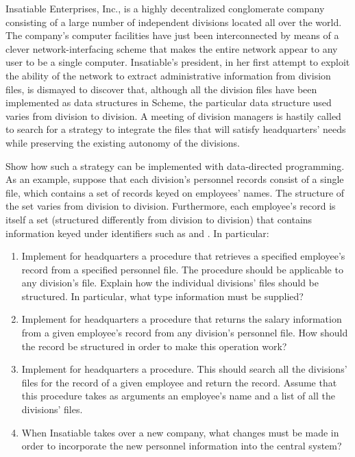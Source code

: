 


\begin{exercise}
	\label{Exercise 2.74}
	Insatiable Enterprises, Inc., is a highly decentralized conglomerate company consisting of a large number of independent divisions located all over the world.
	The company’s computer facilities have just been interconnected by means of a clever network-interfacing scheme that makes the entire network appear to any user to be a single computer.
	Insatiable’s president, in her first attempt to exploit the ability of the network to extract administrative information from division files, is dismayed to discover that, although all the division files have been implemented as data structures in Scheme, the particular data structure used varies from division to division.
	A meeting of division managers is hastily called to search for a strategy to integrate the files that will satisfy headquarters’ needs while preserving the existing autonomy of the divisions.

	Show how such a strategy can be implemented with data-directed programming.
	As an example, suppose that each division’s personnel records consist of a single file, which contains a set of records keyed on employees’ names.
	The structure of the set varies from division to division.
	Furthermore, each employee’s record is itself a set (structured differently from division to division) that contains information keyed under identifiers such as  and .
	In particular:
	\begin{enumerate}[label = \alph*., leftmargin = *]

		\item
			Implement for headquarters a  procedure that retrieves a specified employee’s record from a specified personnel file.
			The procedure should be applicable to any division’s file.
			Explain how the individual divisions’ files should be structured.
			In particular, what type information must be supplied?

		\item
			Implement for headquarters a  procedure that returns the salary information from a given employee’s record from any division’s personnel file.
			How should the record be structured in order to make this operation work?

		\item
			Implement for headquarters a  procedure.
			This should search all the divisions’ files for the record of a given employee and return the record.
			Assume that this procedure takes as arguments an employee’s name and a list of all the divisions’ files.

		\item
			When Insatiable takes over a new company, what changes must be made in order to incorporate the new personnel information into the central system?

	\end{enumerate}
\end{exercise}



